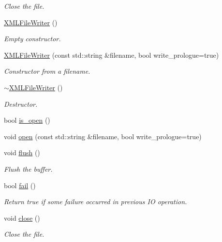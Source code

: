 \begin{DoxyCompactItemize}
\begin{DoxyCompactList}\small\item\em Close the file. \end{DoxyCompactList}\item 
\mbox{\hyperlink{classADATXML_1_1XMLFileWriter_a40db177b66a4598583a3a08e19c1e927}{X\+M\+L\+File\+Writer}} ()
\begin{DoxyCompactList}\small\item\em Empty constructor. \end{DoxyCompactList}\item 
\mbox{\hyperlink{classADATXML_1_1XMLFileWriter_a83cf749ff969a30d3de1895f271b238a}{X\+M\+L\+File\+Writer}} (const std\+::string \&filename, bool write\+\_\+prologue=true)
\begin{DoxyCompactList}\small\item\em Constructor from a filename. \end{DoxyCompactList}\item 
\mbox{\hyperlink{classADATXML_1_1XMLFileWriter_af3d1109d92631884682eac46624ca7fd}{$\sim$\+X\+M\+L\+File\+Writer}} ()
\begin{DoxyCompactList}\small\item\em Destructor. \end{DoxyCompactList}\item 
bool \mbox{\hyperlink{classADATXML_1_1XMLFileWriter_a60fa87bbd9300c37386f9fdcb9460f74}{is\+\_\+open}} ()
\item 
void \mbox{\hyperlink{classADATXML_1_1XMLFileWriter_a76f52e7ccdfe3b82875f30953cfd2447}{open}} (const std\+::string \&filename, bool write\+\_\+prologue=true)
\item 
void \mbox{\hyperlink{classADATXML_1_1XMLFileWriter_a63097bd3fafbcf99804b4106700b524d}{flush}} ()
\begin{DoxyCompactList}\small\item\em Flush the buffer. \end{DoxyCompactList}\item 
bool \mbox{\hyperlink{classADATXML_1_1XMLFileWriter_a0294354e26b7ad1be1ca75f470db4788}{fail}} ()
\begin{DoxyCompactList}\small\item\em Return true if some failure occurred in previous IO operation. \end{DoxyCompactList}\item 
void \mbox{\hyperlink{classADATXML_1_1XMLFileWriter_a1a51ceb51781ac6f3a476dcf99a75017}{close}} ()
\begin{DoxyCompactList}\small\item\em Close the file. \end{DoxyCompactList}\end{DoxyCompactItemize}
